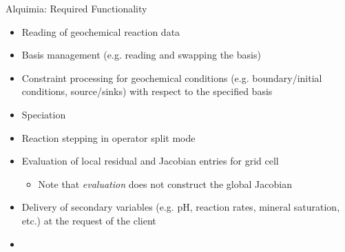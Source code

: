 \documentclass{beamer}
\begin{document}
\begin{frame}{Alquimia: Required Functionality}
\begin{itemize}
\item Reading of geochemical reaction data
\item Basis management (e.g. reading and swapping the basis)
\item Constraint processing for geochemical conditions (e.g. boundary/initial conditions, source/sinks) with respect to the specified basis
\item Speciation
\item Reaction stepping in operator split mode
\item Evaluation of local residual and Jacobian entries for grid cell
\begin{itemize}
\item Note that \emph{evaluation} does not construct the global Jacobian
\end{itemize}
\item Delivery of secondary variables (e.g. pH, reaction rates, mineral saturation, etc.) at the request of the client
\item
\end{itemize}
\end{frame}
\end{document}

